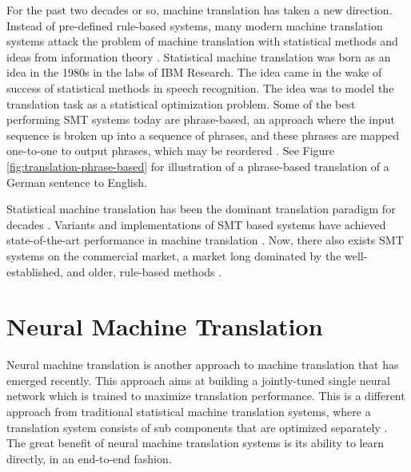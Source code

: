 For the past two decades or so, machine translation has taken a new direction. Instead of pre-defined rule-based systems, many modern machine translation systems attack the problem of machine translation with statistical methods and ideas from information theory \citep{brown1990statistical}. Statistical machine translation was born as an idea in the 1980s in the labs of IBM Research. The idea came in the wake of success of statistical methods in speech recognition. The idea was to model the translation task as a statistical optimization problem. Some of the best performing SMT systems today are phrase-based, an approach where the input sequence is broken up into a sequence of phrases, and these phrases are mapped one-to-one to output phrases, which may be reordered \citep{koehn2010statistical}. See Figure \ref{fig:translation-phrase-based} for illustration of a phrase-based translation of a German sentence to English.

Statistical machine translation has been the dominant translation paradigm for decades \citep{wu2016google}. Variants and implementations of SMT based systems have achieved state-of-the-art performance in machine translation \citep{watanabe07onlinelargemargin}. Now, there also exists SMT systems on the commercial market, a market long dominated by the well-established, and older, rule-based methods \citep{hutchins2007machine}.


\section{Neural Machine Translation}
Neural machine translation is another approach to machine translation that has emerged recently. This approach aims at building a jointly-tuned single neural network which is trained to maximize translation performance. This is a different approach from traditional statistical machine translation systems, where a translation system consists of sub components that are optimized separately \citep{wolk2015neural}. The great benefit of neural machine translation systems is its ability to learn directly, in an end-to-end fashion. 

